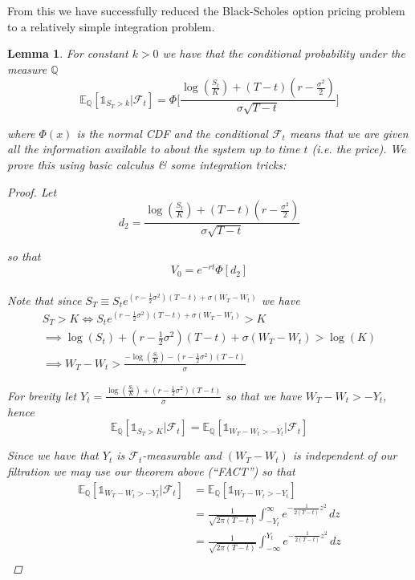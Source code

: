\documentclass[12pt]{article}
\newtheorem{lemma}{Lemma}
\newlength\tindent
\renewcommand{\indent}{\hspace*{\tindent}}
\begin{document}
\indent From this we have successfully reduced the Black-Scholes option pricing problem to a relatively simple integration problem.

\begin{lemma} For constant $k > 0$ we have that the conditional probability under the measure $\mathbb Q$ 
\begin{equation*}
	\mathbb E_{\mathbb Q}[\mathds 1_{S_T > k} | \mathcal F_t] = 
	\Phi\Big[\frac{\log(\frac{S_t}{K}) + (T - t)(r - \frac{\sigma^2}{2})}
		{\sigma\sqrt{T - t}}\Big]
\end{equation*}

where $\Phi(x)$ is the normal CDF and the conditional $\mathcal F_t$ means that we are given all the information available to about the system up to time $t$ (i.e. the price). We prove this using basic calculus \& some integration tricks:

\begin{proof} Let
\begin{equation*}
	d_2 = \frac{\log(\frac{S_t}{K}) + (T - t)(r - \frac{\sigma^2}{2})}
		{\sigma\sqrt{T - t}}
\end{equation*}

so that
\begin{equation*}
	V_0 = e^{-rt}\Phi[d_2]
\end{equation*} \\

Note that since $S_T \equiv S_te^{(r - \frac{1}{2}\sigma^2)(T - t) + \sigma(W_T - W_t)}$ we have
\begin{align*}
	S_T > K \iff S_te^{(r - \frac{1}{2}\sigma^2)(T - t) + \sigma(W_T - W_t)} > K \\
	\implies \log(S_t) + (r - \frac{1}{2}\sigma^2)(T - t) + \sigma(W_T - W_t) > \log(K) \\
	\implies W_T - W_t > \frac{-\log(\frac{S_t}{K}) - (r - \frac{1}{2}\sigma^2)(T - t)}{\sigma}
\end{align*}

For brevity let $Y_t = \frac{\log(\frac{S_t}{K}) + (r - \frac{1}{2}\sigma^2)(T - t)}{\sigma}$ so that we have $W_T - W_t > -Y_t$, hence
\begin{equation*}
	\mathbb E_{\mathbb Q}[\mathds 1_{S_T > K}|\mathcal F_t] = \mathbb E_{\mathbb Q}[\mathds 1_{W_T - W_t > -Y_t} | \mathcal F_t]
\end{equation*}

\indent Since we have that $Y_t$ is $\mathcal F_t$-measurable and $(W_T - W_t)$ is independent of our filtration we may use our theorem above (``FACT'') so that
\begin{align*}
	\mathbb E_{\mathbb Q}[\mathds 1_{W_T - W_t > -Y_t} | \mathcal F_t] &= \mathbb E_{\mathbb Q}[\mathds 1_{W_T - W_t > -Y_t}] \\
	&= \frac{1}{\sqrt{2\pi(T-t)}} \int^\infty_{-Y_t} e^{-\frac{1}{2(T - t)}z^2}\,dz \\
	&= \frac{1}{\sqrt{2\pi(T-t)}} \int^{Y_t}_{-\infty} e^{-\frac{1}{2(T - t)}z^2}\,dz \\
\end{align*}


\end{proof}
\end{lemma}
\end{document}
